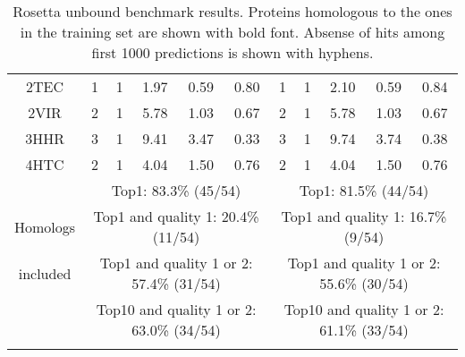 \begin{longtable}{c c c c c c|c c c c c}
 {\tiny 2TEC}&{\tiny 1}&{\tiny 1}&{\tiny 1.97}&{\tiny 0.59}&{\tiny 0.80}&{\tiny 1}&{\tiny 1}&{\tiny 2.10}&{\tiny 0.59}&{\tiny 0.84}\\ 
 {\tiny 2VIR}&{\tiny 2}&{\tiny 1}&{\tiny 5.78}&{\tiny 1.03}&{\tiny 0.67}&{\tiny 2}&{\tiny 1}&{\tiny 5.78}&{\tiny 1.03}&{\tiny 0.67}\\ 
 {\tiny 3HHR}&{\tiny 3}&{\tiny 1}&{\tiny 9.41}&{\tiny 3.47}&{\tiny 0.33}&{\tiny 3}&{\tiny 1}&{\tiny 9.74}&{\tiny 3.74}&{\tiny 0.38}\\ 
 {\tiny 4HTC}&{\tiny 2}&{\tiny 1}&{\tiny 4.04}&{\tiny 1.50}&{\tiny 0.76}&{\tiny 2}&{\tiny 1}&{\tiny 4.04}&{\tiny 1.50}&{\tiny 0.76}\\ 
 \hline
& \multicolumn{5}{c}{\tiny Top1: 83.3\% (45/54)} & \multicolumn{5}{c}{\tiny Top1: 81.5\% (44/54)}  \\ 
 {\tiny Homologs}& \multicolumn{5}{c}{\tiny Top1 and quality 1: 20.4\% (11/54)} & \multicolumn{5}{c}{\tiny Top1 and quality 1: 16.7\% (9/54)}  \\ 
 {\tiny included}& \multicolumn{5}{c}{\tiny Top1 and quality 1 or 2: 57.4\% (31/54)} & \multicolumn{5}{c}{\tiny Top1 and quality 1 or 2: 55.6\% (30/54)}  \\ 
 & \multicolumn{5}{c}{\tiny Top10 and quality 1 or 2: 63.0\% (34/54)} & \multicolumn{5}{c}{\tiny Top10 and quality 1 or 2: 61.1\% (33/54)}  \\ 
 
\caption[Rosetta unbound benchmark results with homologs]{Rosetta unbound benchmark results. Proteins homologous to the ones in the training set are shown with bold font. 
Absense of hits among first 1000 predictions is shown with hyphens.}
\label{RosettaTableC} 
 \end{longtable}